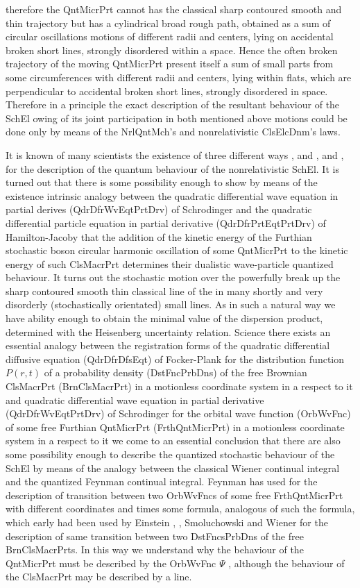 \documentclass[12pt]{article}
\begin{document}
therefore the QntMicrPrt cannot has the classical sharp contoured smooth and
thin trajectory but has a cylindrical broad rough path, obtained as a sum
of circular oscillations motions of different radii and centers, lying on
accidental broken short lines, strongly disordered within a space. Hence
the often broken trajectory of the moving QntMicrPrt present itself a sum
of small parts from some circumferences with different radii and centers,
lying within flats, which are perpendicular to accidental broken short
lines, strongly disordered in space. Therefore in a principle the exact
description of the resultant behaviour of the SchEl owing of its joint
participation in both mentioned above motions could be done only by means
of the NrlQntMch's and nonrelativistic ClsElcDnm's laws.

 It is known of many scientists the existence of three different ways
\cite{WH}, \cite{MBPJ} and \cite{BHJ}, \cite{EScha} and \cite{RPF},
\cite{FH} for the description of the quantum behaviour \cite{LB} of the
nonrelativistic SchEl. It is turned out that there is some possibility
enough to show by means of the existence intrinsic analogy between the
quadratic differential wave equation in partial derives (QdrDfrWvEqtPrtDrv)
of Schrodinger and the quadratic differential particle equation in partial
derivative (QdrDfrPrtEqtPrtDrv) of Hamilton-Jacoby that the addition of the
kinetic energy of the Furthian stochastic boson circular harmonic oscillation
of some QntMicrPrt to the kinetic energy of such ClsMacrPrt determines their
dualistic wave-particle quantized behaviour. It turns out the stochastic
motion over the powerfully break up the sharp contoured smooth thin classical line of the in many shortly and
very disorderly (stochastically orientated) small lines. As in such a natural
way we have ability enough to obtain the minimal value of the dispersion
product, determined with the Heisenberg uncertainty relation. Science there
exists an essential analogy between the registration forms of the quadratic
differential diffusive equation (QdrDfrDfsEqt) of Focker-Plank for the
distribution function $P(r,t)$ of a probability density (DstFncPrbDns) of
the free Brownian ClsMacrPrt (BrnClsMacrPrt) in a motionless coordinate
system in a respect to it and quadratic differential wave equation in
partial derivative (QdrDfrWvEqtPrtDrv) of Schrodinger for the orbital wave
function (OrbWvFnc) of some free Furthian QntMicrPrt (FrthQntMicrPrt) in a
motionless coordinate system in a respect to it we come to an essential
conclusion that there are also some possibility enough to describe the
quantized stochastic behaviour of the SchEl by means of the analogy between
the classical Wiener continual integral and the quantized Feynman continual
integral. Feynman has used for the description of transition between two
OrbWvFncs of some free FrthQntMicrPrt with different coordinates and times
some formula, analogous of such the formula, which early had been used by
Einstein \cite{AE}, \cite{ES}, Smoluchowski \cite{MS} and Wiener \cite{NW}
for the description of same transition between two DstFncsPrbDns of the
free BrnClsMacrPrts. In this way we understand why the behaviour of the
QntMicrPrt must be described by the OrbWvFnc $\Psi$ , although the
behaviour of the ClsMacrPrt may be described by a line.
\end{document}
